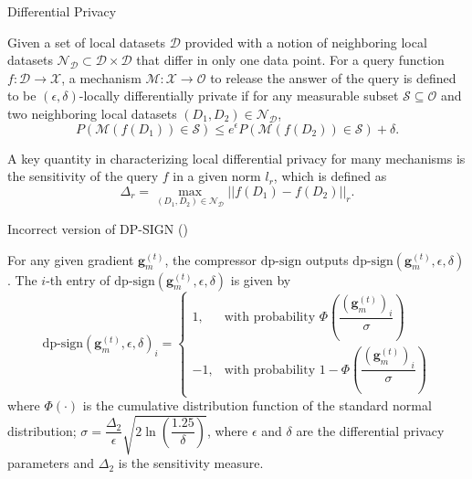 \documentclass{beamer}
\begin{document}
\begin{frame}{Differential Privacy}
    \begin{definition}
        Given a set of local datasets $\mathcal{D}$ provided with a notion of neighboring local datasets $\mathcal{N}_{\mathcal{D}}\subset \mathcal{D}\times \mathcal{D}$ that differ in only one data point. For a query function $f: \mathcal{D}\rightarrow \mathcal{X}$, a mechanism $\mathcal{M}:\mathcal{X}\rightarrow \mathcal{O}$ to release the answer of the query is defined to be $(\epsilon,\delta)$-locally differentially private if for any measurable subset $\mathcal{S}\subseteq\mathcal{O}$ and two neighboring local datasets $(D_1,D_2)\in \mathcal{N}_{\mathcal{D}}$,
        $$
        P(\mathcal{M}(f(D_1))\in \mathcal{S}) \leq e^{\epsilon}P(\mathcal{M}(f(D_2))\in \mathcal{S}) + \delta.
        $$
    \end{definition}
        
        A key quantity in characterizing local differential privacy for many mechanisms is the sensitivity of the query $f$ in a given norm $l_{r}$, which is defined as
        $$
        \Delta_{r} = \max_{(D_1,D_2)\in\mathcal{N}_{\mathcal{D}}}||f(D_1)-f(D_2)||_r.
        $$
\end{frame}
\begin{frame}{Incorrect version of DP-SIGN (\cite{Jin2020})}
\begin{definition}
    For any given gradient $\boldsymbol{g}_{m}^{(t)}$, the compressor $\mathrm{dp\text{-}sign}$ outputs $\mathrm{dp\text{-}sign}(\boldsymbol{g}_{m}^{(t)},\epsilon,\delta)$. The $i$-th entry of $\mathrm{dp\text{-}sign}(\boldsymbol{g}_{m}^{(t)},\epsilon,\delta)$ is given by
    $$
    \mathrm{dp\text{-}sign}(\boldsymbol{g}_{m}^{(t)},\epsilon,\delta)_{i} =
    \begin{cases}
    1, & \text{with probability } \Phi\left(\dfrac{(\boldsymbol{g}_{m}^{(t)})_{i}}{\sigma}\right) \\[1.5ex]
    -1, & \text{with probability } 1-\Phi\left(\dfrac{(\boldsymbol{g}_{m}^{(t)})_{i}}{\sigma}\right)
    \end{cases}
    $$
    where $\Phi(\cdot)$ is the cumulative distribution function of the standard normal distribution; $\sigma = \dfrac{\Delta_{2}}{\epsilon}\sqrt{2\ln\left(\dfrac{1.25}{\delta}\right)}$, where $\epsilon$ and $\delta$ are the differential privacy parameters and $\Delta_2$ is the sensitivity measure.
\end{definition}
\end{frame}
\end{document}
